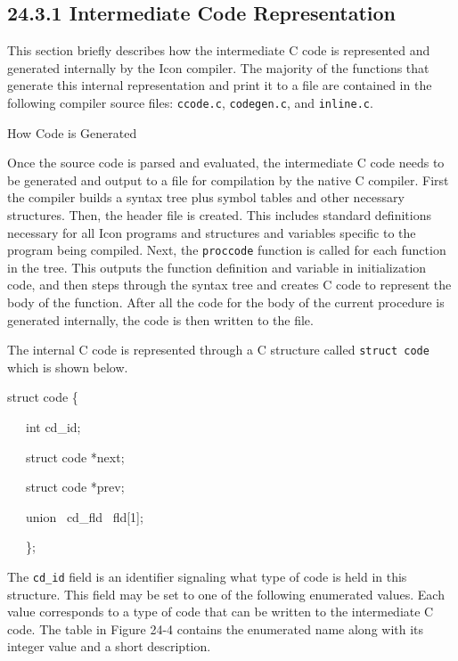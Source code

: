 \subsection[24.3.1 Intermediate Code Representation]{24.3.1 Intermediate Code Representation}

This section briefly describes how the intermediate C code is
represented and generated internally by the Icon compiler.  The
majority of the functions that generate this internal representation
and print it to a file are contained in the following compiler source
files: \texttt{ccode.c}, \texttt{codegen.c}, and \texttt{inline.c}.

{\sffamily
How Code is Generated}

Once the source code is parsed and evaluated, the intermediate C code
needs to be generated and output to a file for compilation by the
native C compiler. First the compiler builds a syntax tree plus symbol
tables and other necessary structures. Then, the header file is
created. This includes standard definitions necessary for all Icon
programs and structures and variables specific to the program being
compiled. Next, the \texttt{proccode} function is called for each
function in the tree. This outputs the function definition and
variable in initialization code, and then steps through the syntax
tree and creates C code to represent the body of the function. After
all the code for the body of the current procedure is generated
internally, the code is then written to the file.

The internal C code is represented through a C structure called
\texttt{struct code} which is shown below.

{\ttfamily\mdseries
struct code \{}

{\ttfamily\mdseries
\ \ \ int cd\_id;}

{\ttfamily\mdseries
\ \ \ struct code *next;}

{\ttfamily\mdseries
\ \ \ struct code *prev;}

{\ttfamily\mdseries
\ \ \ union \ cd\_fld \ fld[1];}

{\ttfamily\mdseries
\ \ \ \};}


The \texttt{cd\_id} field is an identifier signaling what type of code
is held in this structure. This field may be set to one of the
following enumerated values. Each value corresponds to a type of code
that can be written to the intermediate C code. The table in Figure
24-4 contains the enumerated name along with its integer value and a
short description.

